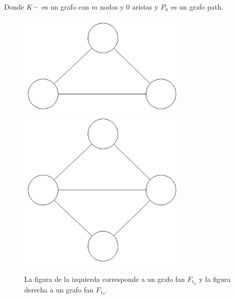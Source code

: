 Donde $K ^ __ (m)$ es un grafo con $m$ nodos y 0 aristas y $P_n$ es un grafo path.

\begin{figure}[H]
\includegraphics[width=80mm]{F1_2.png}
\includegraphics[width=80mm]{F1_3.png}
\caption{La figura de la izquierda corresponde a un grafo fan $F_1_2$ y la figura derecha a un grafo fan $F_1_3$.}
\label{overflow}
\end{figure}

